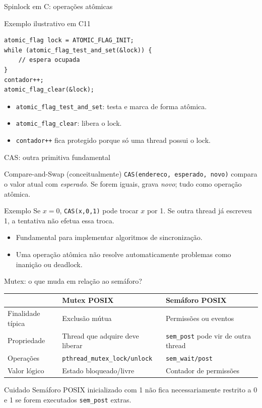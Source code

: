 \documentclass[aspectratio=169,11pt]{beamer}
\begin{document}
\begin{frame}[fragile]{Spinlock em C: operações atômicas}
\small
\begin{block}{Exemplo ilustrativo em C11}
\begin{verbatim}
atomic_flag lock = ATOMIC_FLAG_INIT;
while (atomic_flag_test_and_set(&lock)) {
    // espera ocupada
}
contador++;
atomic_flag_clear(&lock);
\end{verbatim}
\end{block}
\begin{itemize}
\item \texttt{atomic\_flag\_test\_and\_set}: testa e marca de forma atômica.
\item \texttt{atomic\_flag\_clear}: libera o lock.
\item \texttt{contador++} fica protegido porque só uma thread possui o lock.
\end{itemize}
\end{frame}

\begin{frame}{CAS: outra primitiva fundamental}
\small
\begin{block}{Compare-and-Swap (conceitualmente)}
\texttt{CAS(endereco, esperado, novo)} compara o valor atual com \emph{esperado}. Se forem iguais, grava \emph{novo}; tudo como operação atômica.
\end{block}
\begin{exampleblock}{Exemplo}
Se \(x=0\), \texttt{CAS(x,0,1)} pode trocar \(x\) por 1. Se outra thread já escreveu 1, a tentativa não efetua essa troca.
\end{exampleblock}
\begin{itemize}
\item Fundamental para implementar algoritmos de sincronização.
\item Uma operação atômica não resolve automaticamente problemas como inanição ou deadlock.
\end{itemize}
\end{frame}

\begin{frame}{Mutex: o que muda em relação ao semáforo?}
\small
\begin{tabular}{p{3cm}p{4.3cm}p{3cm}}
\toprule
 & \textbf{Mutex POSIX} & \textbf{Semáforo POSIX}\\
\midrule
Finalidade típica & Exclusão mútua & Permissões ou eventos\\
Propriedade & Thread que adquire deve liberar & \texttt{sem\_post} pode vir de outra thread\\
Operações & \texttt{pthread\_mutex\_lock/unlock} & \texttt{sem\_wait/post}\\
Valor lógico & Estado bloqueado/livre & Contador de permissões\\
\bottomrule
\end{tabular}
\vspace{.3cm}
\begin{alertblock}{Cuidado}
Semáforo POSIX inicializado com 1 não fica necessariamente restrito a 0 e 1 se forem executados \texttt{sem\_post} extras.
\end{alertblock}
\end{frame}
\end{document}
